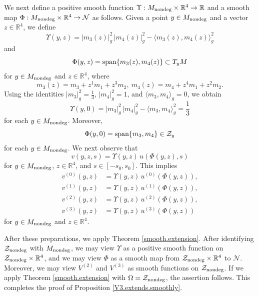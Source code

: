 \documentclass[11pt]{amsart}
\theoremstyle{definition}
\begin{document}
We next define a positive smooth function $\Upsilon: M_{\text{\rm nondeg}} \times \mathbb{R}^4 \to \mathbb{R}$ and a smooth map $\Phi: M_{\text{\rm nondeg}} \times \mathbb{R}^4 \to \mathcal{N}$ as follows. Given a point $y \in M_{\text{\rm nondeg}}$ and a vector $z \in \mathbb{R}^4$, we define 
\begin{equation} 
\label{definition.of.Upsilon}
\Upsilon(y,z) = |m_3(z)|_g^2 \, |m_4(z)|_g^2 - \langle m_3(z),m_4(z) \rangle_g^2 
\end{equation}
and 
\begin{equation} 
\label{definition.of.Phi}
\Phi(y,z) = \text{\rm span}\{m_3(z),m_4(z)\} \subset T_y M 
\end{equation}
for $y \in M_{\text{\rm nondeg}}$ and $z \in \mathbb{R}^4$, where 
\[ m_3(z)=m_3+z^1 m_1+z^3 m_2,\ m_4(z)=m_4+z^4 m_1+z^2 m_2. \] 
Using the identities $|m_3|_g^2 = \frac{1}{3}$, $|m_4|_g^2 = 1$, and $\langle m_3,m_4 \rangle_g = 0$, we obtain 
\[\Upsilon(y,0) = |m_3|_g^2 \, |m_4|_g^2 - \langle m_3,m_4 \rangle_g^2 = \frac{1}{3}\]
for each $y \in M_{\text{\rm nondeg}}$. Moreover, 
\[\Phi(y,0) = \text{\rm span}\{m_3,m_4\} \in \mathcal{Z}_y\] 
for each $y \in M_{\text{\rm nondeg}}$. We next observe that 
\[v(y,z,s) = \Upsilon(y,z) \, u(\Phi(y,z),s)\]
for $y \in M_{\text{\rm nondeg}}$, $z \in \mathbb{R}^4$, and $s \in [-s_0,s_0]$. This implies 
\begin{align*}
v^{(0)}(y,z) &= \Upsilon(y,z) \, u^{(0)}(\Phi(y,z)), \\ 
v^{(1)}(y,z) &= \Upsilon(y,z) \, u^{(1)}(\Phi(y,z)), \\ 
v^{(2)}(y,z) &= \Upsilon(y,z) \, u^{(2)}(\Phi(y,z)), \\ 
v^{(3)}(y,z) &= \Upsilon(y,z) \, u^{(3)}(\Phi(y,z)) 
\end{align*}
for $y \in M_{\text{\rm nondeg}}$ and $z \in \mathbb{R}^4$. 

After these preparations, we apply Theorem \ref{smooth.extension}. After identifying $\mathcal{Z}_{\rm nondeg}$ with $M_{\text{\rm nondeg}}$, we may view $\Upsilon$ as a positive smooth function on $\mathcal{Z}_{\text{\rm nondeg}} \times \mathbb{R}^4$, and we may view $\Phi$ as a smooth map from $\mathcal{Z}_{\text{\rm nondeg}} \times \mathbb{R}^4$ to $\mathcal{N}$. Moreover, we may view $V^{(2)}$ and $V^{(3)}$ as smooth functions on $\mathcal{Z}_{\text{\rm nondeg}}$. If we apply Theorem \ref{smooth.extension} with $\Omega = \mathcal{Z}_{\text{\rm nondeg}}$, the assertion follows. This completes the proof of Proposition \ref{V3.extends.smoothly}. \\
\end{document}
